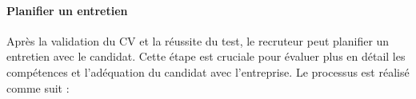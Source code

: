
\paragraph*{Planifier un entretien}

Après la validation du CV et la réussite du test, le recruteur peut 
planifier un entretien avec le candidat. Cette étape est cruciale pour 
évaluer plus en détail les compétences et l'adéquation du 
candidat avec l'entreprise. 
Le processus est 
réalisé comme suit :

